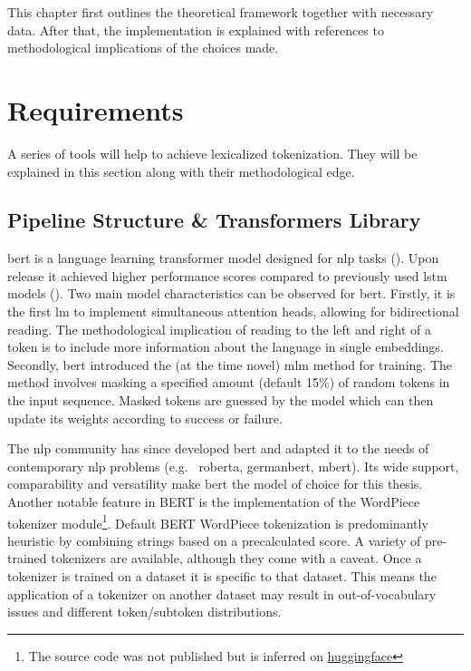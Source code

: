 This chapter first outlines the theoretical framework together with necessary data.
After that, the implementation is explained with references to methodological implications of the choices made.

\section{Requirements}
\label{sec:requirements}
A series of tools will help to achieve lexicalized tokenization.
They will be explained in this section along with their methodological edge.

\subsection{Pipeline Structure \& Transformers Library}
\label{subsec:architecture}

\ac{bert} is a language learning transformer model designed for \ac{nlp} tasks (\cite{ATTENTION}).
Upon release it achieved higher performance scores compared to previously used \ac{lstm} models (\cite{BERTHIGH1}).
Two main model characteristics can be observed for \ac{bert}.
Firstly, it is the first \ac{lm} to implement simultaneous attention heads, allowing for bidirectional reading.
The methodological implication of reading to the left and right of a token is to include more information about the language in single embeddings.
Secondly, \ac{bert} introduced the (at the time novel) \ac{mlm} method for training.
The method involves masking a specified amount (default 15\%) of random tokens in the input sequence.
Masked tokens are guessed by the model which can then update its weights according to success or failure.

The \ac{nlp} community has since developed \ac{bert} and adapted it to the needs of contemporary \ac{nlp} problems (e.g. \ roberta, germanbert, mbert).
Its wide support, comparability and versatility make \ac{bert} the model of choice for this thesis.
Another notable feature in \uppercase{bert} is the implementation of the WordPiece tokenizer module\footnote{The source code was not published but is inferred on \href{https://huggingface.co/course/chapter6/6?fw=pt}{huggingface}}.
Default BERT WordPiece tokenization is predominantly heuristic by combining strings based on a precalculated score.
A variety of pre-trained tokenizers are available, although they come with a caveat.
Once a tokenizer is trained on a dataset it is specific to that dataset.
This means the application of a tokenizer on another dataset may result in out-of-vocabulary issues and different token/subtoken distributions.

